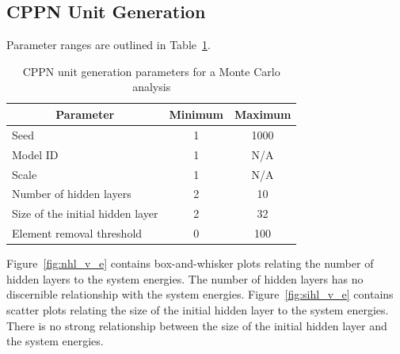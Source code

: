 \subsection{CPPN Unit Generation}

Parameter ranges are outlined in Table~\ref{tab:cppnmc}.

\begin{table}[H]
\centering
\caption{CPPN unit generation parameters for a Monte Carlo analysis}
\label{tab:cppnmc}
\begin{tabular}{@{}lcc@{}}
\toprule
\multicolumn{1}{c}{\textbf{Parameter}} & \textbf{Minimum} & \textbf{Maximum} \\ \midrule
Seed                                   & 1                & 1000             \\
Model ID                               & 1                & N/A              \\
Scale                                  & 1                & N/A              \\
Number of hidden layers                & 2                & 10               \\
Size of the initial hidden layer       & 2                & 32               \\
Element removal threshold              & 0                & 100              \\ \bottomrule
\end{tabular}
\end{table}

Figure~\ref{fig:nhl_v_e} contains box-and-whisker plots relating the number of hidden layers to the system energies. The number of hidden layers has no discernible relationship with the system energies. Figure~\ref{fig:sihl_v_e} contains scatter plots relating the size of the initial hidden layer to the system energies. There is no strong relationship between the size of the initial hidden layer and the system energies.

